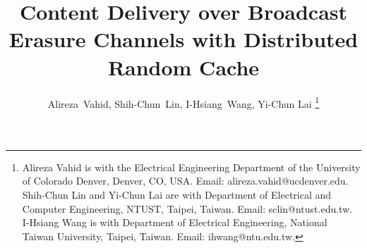 \documentclass[journal,12pt,draftcls,onecolumn]{IEEEtran}
\begin{document}
\title{Content Delivery over Broadcast Erasure Channels with Distributed Random Cache}



\author{
Alireza~Vahid, Shih-Chun~Lin, I-Hsiang~Wang, Yi-Chun Lai
\thanks{Alireza Vahid is with the Electrical Engineering Department of the University of Colorado Denver, Denver, CO, USA. Email: {\sffamily alireza.vahid@ucdenver.edu}. Shih-Chun Lin and Yi-Chun Lai are with Department of Electrical and Computer Engineering, NTUST, Taipei, Taiwan. Email: {\sffamily sclin@ntust.edu.tw}. I-Hsiang Wang is with Department of Electrical Engineering, National Taiwan University, Taipei, Taiwan. Email: {\sffamily ihwang@ntu.edu.tw}.}
}



\maketitle

\end{document}
